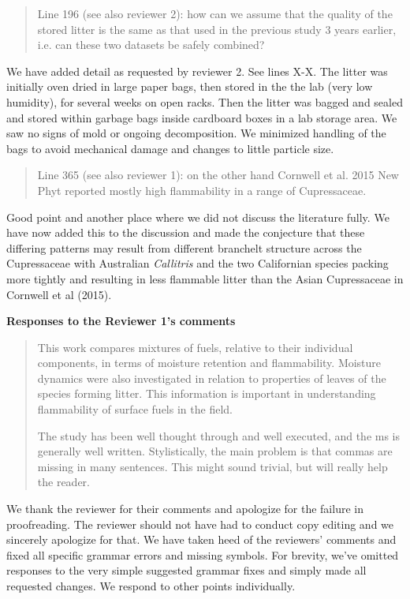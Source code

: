\documentclass[letterpaper, 12pt]{letter}
\begin{document}
\begin{letter}{}
\begin{quote}
Line 196 (see also reviewer 2): how can we assume that the quality of the stored litter is the same as that used in the previous study 3 years earlier, i.e. can these two datasets be safely combined?
\end{quote}

We have added detail as requested by reviewer 2. See lines X-X. The litter was initially oven dried in large paper bags, then stored in the the lab (very low humidity), for several weeks on
open racks. Then the litter was bagged and sealed and stored within garbage
bags inside cardboard boxes in a lab storage area. We saw no signs of mold or
ongoing decomposition. We minimized handling of the bags to avoid mechanical
damage and changes to little particle size.


\begin{quote}
Line 365 (see also reviewer 1): on the other hand Cornwell et al. 2015 New Phyt reported mostly high flammability in a range of Cupressaceae.
\end{quote}

Good point and another place where we did not discuss the literature fully. We
have now added this to the discussion and made the conjecture that these
differing patterns may result from different branchelt structure across the
Cupressaceae with Australian \emph{Callitris} and the two Californian species
packing more tightly and resulting in less flammable litter than the Asian
Cupressaceae in Cornwell et al (2015).


{\bf Responses to the Reviewer 1's comments}

\begin{quote}
This work compares mixtures of fuels, relative to their individual components, in terms of moisture retention and flammability. Moisture dynamics were also investigated in relation to properties of leaves of the species forming litter. This information is important in understanding flammability of surface fuels in the field. 

The study has been well thought through and well executed, and the ms is generally well written. Stylistically, the main problem is that commas are missing in many sentences. This might sound trivial, but will really help the reader.
\end{quote}

We thank the reviewer for their comments and apologize for the failure in
proofreading. The reviewer should not have had to conduct copy editing and we
sincerely apologize for that. We have taken heed of the reviewers' comments and
fixed all specific grammar errors and missing symbols. For brevity, we've
omitted responses to the very simple suggested grammar fixes and simply made all
requested changes. We respond to other points individually.


\end{letter}
\end{document}
